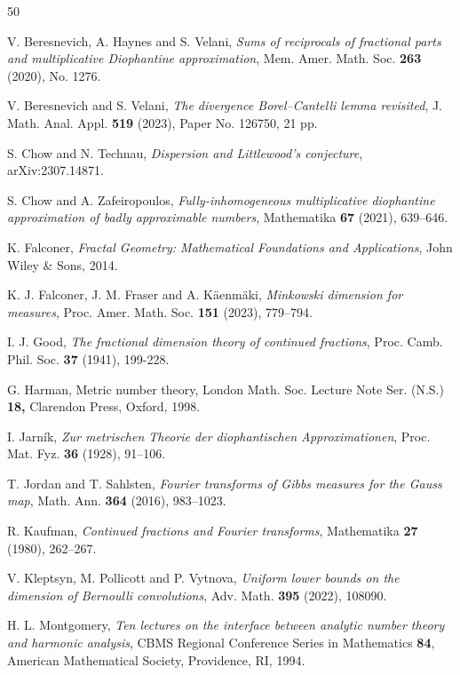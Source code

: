 \documentclass[12pt, reqno]{amsart}
\theoremstyle{definition}
\theoremstyle{remark}
\numberwithin{equation}{section}
\begin{document}
\providecommand{\bysame}{\leavevmode\hbox to3em{\hrulefill}\thinspace}
\begin{thebibliography}{50}

V. Beresnevich, A. Haynes and S. Velani, \emph{Sums of reciprocals of fractional parts and multiplicative Diophantine approximation},
Mem. Amer. Math. Soc. \textbf{263} (2020), No. 1276.

V. Beresnevich  and S. Velani, \emph{The divergence Borel--Cantelli lemma revisited}, J. Math. Anal. Appl. \textbf{519} (2023), Paper No. 126750, 21 pp.

S. Chow and N. Technau,
\emph{Dispersion and Littlewood's conjecture}, arXiv:2307.14871.

S. Chow and A. Zafeiropoulos, \emph{Fully-inhomogeneous multiplicative diophantine approximation of badly approximable numbers}, Mathematika \textbf{67} (2021), 639--646.

K. Falconer, \emph{Fractal Geometry: Mathematical Foundations and Applications}, John Wiley \& Sons, 2014.

K. J. Falconer, J. M. Fraser and A. K\"aenm\"aki, \emph{Minkowski dimension for measures}, Proc. Amer. Math. Soc. \textbf{151} (2023), 779--794.

I. J. Good, \emph{The fractional dimension theory of continued fractions}, Proc. Camb. Phil. Soc. \textbf{37} (1941), 199-228.

G. Harman, Metric number theory, London Math. Soc. Lecture Note Ser. (N.S.) \textbf{18,} Clarendon Press, Oxford, 1998.

I. Jarn\'ik, \emph{Zur metrischen Theorie der diophantischen Approximationen}, Proc. Mat. Fyz.
\textbf{36} (1928), 91--106.

T. Jordan and T. Sahlsten, 
\emph{Fourier transforms of Gibbs measures for the Gauss map}, 
Math. Ann. \textbf{364} (2016), 
983--1023.

R. Kaufman, \emph{Continued fractions and Fourier transforms}, Mathematika \textbf{27} (1980), 
262--267.

V. Kleptsyn, M. Pollicott and P. Vytnova, \emph{Uniform lower bounds on the dimension of Bernoulli
convolutions}, Adv. Math.
\textbf{395} (2022), 108090.

H. L. Montgomery, \emph{Ten lectures on the interface between analytic number theory and harmonic analysis},
CBMS Regional Conference Series in Mathematics \textbf{84}, American Mathematical Society, Providence, RI, 1994.


\end{thebibliography}
\end{document}
